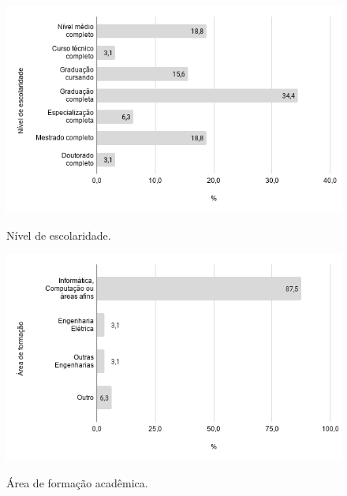     
        \begin{figure}[!htb]
        \centering
        \includegraphics[width=.80\textwidth]{images/s_escolaridade.png}
        \label{figure:s_escolaridade}
        \caption{Nível de escolaridade.}
        \end{figure}
    
    
        \begin{figure}[!htb]
        \centering
        \includegraphics[width=.80\textwidth]{images/s_areaformacaoacademica.png}
        \label{figure:s_areaformacaoacademica}
        \caption{Área de formação acadêmica.}
        \end{figure}
    
